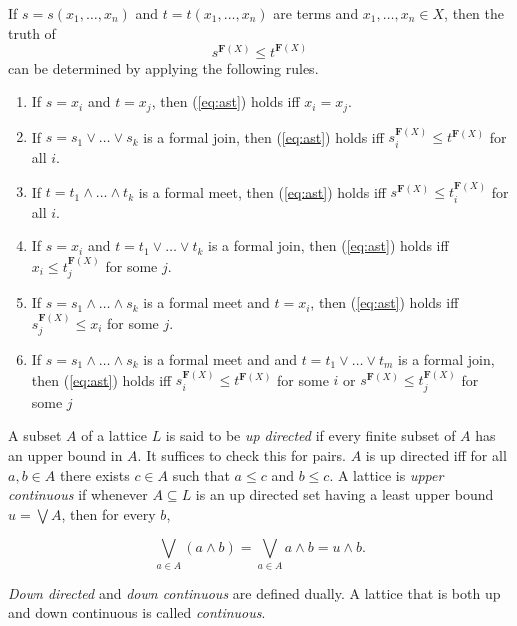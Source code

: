 \begin{theorem}
  \label{thm:wordprob}
If $s = s(x_1, \dots, x_n)$ and $t = t(x_1, \dots, x_n)$ are terms and $x_1, \dots, x_n \in X$, then the truth of 
\begin{equation}
  \label{eq:ast}
s^{\mathbf{F}(X)} \leqslant t^{\mathbf{F}(X)}
\end{equation}
can be determined by applying the following rules.
\begin{enumerate}
\item If $s=x_i$ and $t=x_j$, then (\ref{eq:ast}) holds iff $x_i = x_j$.
\item If $s = s_1 \vee \dots \vee s_k$ is a formal join, then (\ref{eq:ast}) holds iff $s_i^{\mathbf{F}(X)} \leqslant t^{\mathbf{F}(X)}$ for all $i$.
\item If $t = t_1 \wedge \dots \wedge t_k$ is a formal meet, then (\ref{eq:ast}) holds iff 
$s^{\mathbf{F}(X)} \leqslant t_i^{\mathbf{F}(X)}$ for all $i$.
\item If $s = x_i$ and $t = t_1 \vee \dots \vee t_k$ is a formal join, 
   then (\ref{eq:ast}) holds iff $x_i \leqslant t_j^{\mathbf{F}(X)}$ for some $j$.
\item If $s = s_1 \wedge \dots \wedge s_k$ is a formal meet and $t = x_i$, then (\ref{eq:ast}) holds iff $s_j^{\mathbf{F}(X)} \leqslant x_i$ for some $j$.
\item If $s = s_1 \wedge \dots \wedge s_k$ is a formal meet and 
and $t = t_1 \vee \dots \vee t_m$ is a formal join, then (\ref{eq:ast}) holds iff 
$s_i^{\mathbf{F}(X)} \leqslant t^{\mathbf{F}(X)}$ for some $i$
or $s^{\mathbf{F}(X)} \leqslant t_j^{\mathbf{F}(X)}$ for some $j$
\end{enumerate}
\end{theorem}

\begin{definition} A subset $A$ of a lattice $L$ is said to be \emph{up directed} if every finite subset of $A$ has an upper bound in $A$.
It suffices to check this for pairs.  $A$ is up directed iff for all $a, b \in A$
there exists $c\in A$ such that $a\leqslant c$ and $b\leqslant c$.  A lattice is \emph{upper continuous} if whenever $A\subseteq L$ is an up directed set having a least upper
bound $u = \bigvee A$, then for every $b$,

\[\bigvee_{a\in A} (a \wedge b) = 
\bigvee_{a\in A} a \wedge b =  u \wedge b.\]

\emph{Down directed} and \emph{down continuous} are defined dually.  A lattice that is 
both up and down continuous is called \emph{continuous}.
\end{definition}

